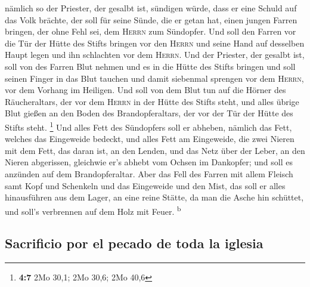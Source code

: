  nämlich so der Priester, der gesalbt ist, sündigen würde,
dass er eine Schuld auf das Volk brächte, der soll für seine Sünde, die
er getan hat, einen jungen Farren bringen, der ohne Fehl sei, dem
\textsc{Herrn} zum Sündopfer.  Und soll den Farren vor die
Tür der Hütte des Stifts bringen vor den \textsc{Herrn} und seine Hand
auf desselben Haupt legen und ihn schlachten vor dem \textsc{Herrn}.
 Und der Priester, der gesalbt ist, soll von des Farren
Blut nehmen und es in die Hütte des Stifts bringen  und
soll seinen Finger in das Blut tauchen und damit siebenmal sprengen vor
dem \textsc{Herrn}, vor dem Vorhang im Heiligen.  Und soll
von dem Blut tun auf die Hörner des Räucheraltars, der vor dem
\textsc{Herrn} in der Hütte des Stifts steht, und alles übrige Blut
gießen an den Boden des Brandopferaltars, der vor der Tür der Hütte des
Stifts steht. \footnote{\textbf{4:7} 2Mo 30,1; 2Mo 30,6; 2Mo 40,6}
 Und alles Fett des Sündopfers soll er abheben, nämlich
das Fett, welches das Eingeweide bedeckt, und alles Fett am Eingeweide,
 die zwei Nieren mit dem Fett, das daran ist, an den
Lenden, und das Netz über der Leber, an den Nieren abgerissen,
 gleichwie er's abhebt vom Ochsen im Dankopfer; und soll
es anzünden auf dem Brandopferaltar.  Aber das Fell des
Farren mit allem Fleisch samt Kopf und Schenkeln und das Eingeweide und
den Mist,  das soll er alles hinausführen aus dem Lager,
an eine reine Stätte, da man die Asche hin schüttet, und soll's
verbrennen auf dem Holz mit Feuer. \textsuperscript{b}

\hypertarget{sacrificio-por-el-pecado-de-toda-la-iglesia}{%
\subsection{Sacrificio por el pecado de toda la
iglesia}\label{sacrificio-por-el-pecado-de-toda-la-iglesia}}

